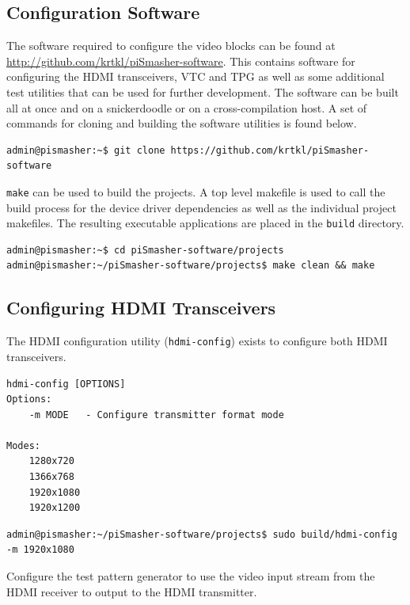 \documentclass[sfsidenotes, justified]{tufte-handout}
\begin{document}
	\subsection{Configuration Software}
	
	The software required to configure the video blocks can be found at \url{http://github.com/krtkl/piSmasher-software}. This contains software for configuring the HDMI transceivers, VTC and TPG as well as some additional test utilities that can be used for further development. The software can be built all at once and on a snickerdoodle or on a cross-compilation host. A set of commands for cloning and building the software utilities is found below.
	
	\begin{lstlisting}[caption=Clone piSmasher Software Repository]
admin@pismasher:~$ git clone https://github.com/krtkl/piSmasher-software
	\end{lstlisting}

\texttt{make} can be used to build the projects. A top level makefile is used to call the build process for the device driver dependencies as well as the individual project makefiles. The resulting executable applications are placed in the \texttt{build} directory.
	
	\begin{lstlisting}
admin@pismasher:~$ cd piSmasher-software/projects
admin@pismasher:~/piSmasher-software/projects$ make clean && make
	\end{lstlisting}

	\subsection{Configuring HDMI Transceivers}    
    
  The HDMI configuration utility (\texttt{hdmi-config}) exists to configure both HDMI transceivers.
       
	\begin{lstlisting}[style=text]
hdmi-config [OPTIONS]
Options:
    -m MODE   - Configure transmitter format mode

Modes:
    1280x720
    1366x768
    1920x1080
    1920x1200
	\end{lstlisting}

\begin{lstlisting}
admin@pismasher:~/piSmasher-software/projects$ sudo build/hdmi-config -m 1920x1080
\end{lstlisting}
    
	Configure the test pattern generator to use the video input stream from the HDMI receiver to output to the HDMI transmitter.
	
\end{document}
